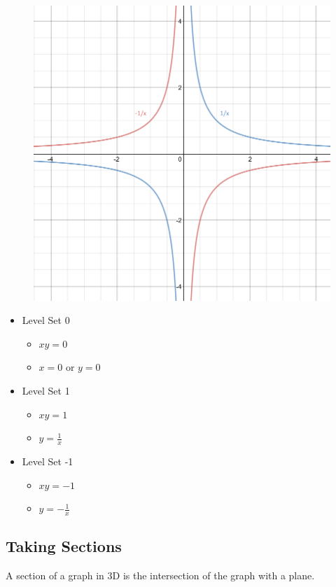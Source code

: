 \documentclass{article}
\begin{document}
\begin{figure}[h!]
    \centering
    \includegraphics[scale=.2]{levelSetsNew.png}
    \label{}
\end{figure}
\begin{itemize}
    \item Level Set 0
    \begin{itemize}
        \item $xy=0$
        \item $x=0$ or $y=0$    
    \end{itemize}
    \item Level Set 1
    \begin{itemize}
        \item $xy=1$
        \item $y=\frac{1}{x}$    
    \end{itemize}
    \item Level Set -1
    \begin{itemize}
        \item $xy=-1$
        \item $y=-\frac{1}{x}$    
    \end{itemize}
\end{itemize}

\subsection{Taking Sections}
A section of a graph in 3D is the intersection of the graph with a plane.
\end{document}
